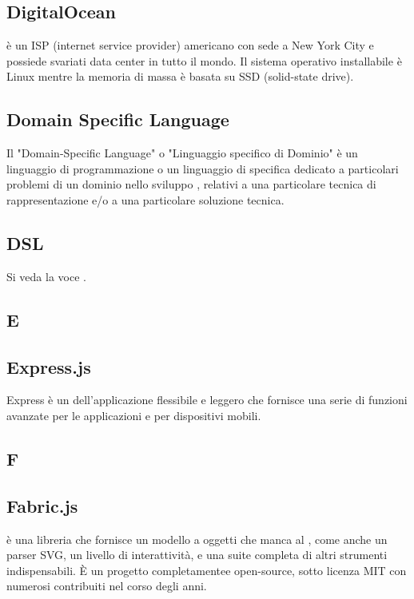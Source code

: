 \subsection*{DigitalOcean}
 è un ISP (internet service provider) americano con sede a New York City e possiede svariati data center in tutto il mondo. Il sistema operativo installabile è Linux mentre la memoria di massa è basata su SSD (solid-state drive).

\subsection*{Domain Specific Language}
Il "Domain-Specific Language" o "Linguaggio specifico di Dominio" è un linguaggio
di programmazione o un linguaggio di specifica dedicato a particolari
problemi di un dominio nello sviluppo , relativi a una particolare tecnica
di rappresentazione e/o a una particolare soluzione tecnica.

\subsection*{DSL}
Si veda la voce .

\newpage

\begin{center}
\Huge\section*{\uppercase{E}}
\end{center}

\subsection*{Express.js}
Express è un  dell'applicazione   flessibile e leggero che fornisce una serie di funzioni avanzate per le applicazioni  e per dispositivi mobili.

\newpage

\begin{center}
\Huge\section*{\uppercase{F}}
\end{center}

\subsection*{Fabric.js}
 è una libreria che fornisce un modello a oggetti che manca al , come anche un parser SVG, un livello di interattività, e una suite completa di altri strumenti indispensabili. È un progetto completamentee open-source, sotto licenza MIT con numerosi contribuiti nel corso degli anni.

